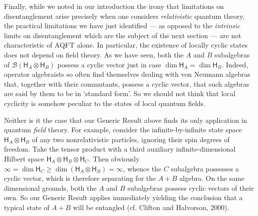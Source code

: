 \documentclass[12pt]{article}
\newcommand{\alg}[1]{\mbox{$\mathcal{#1}$}}
\newcommand{\hil}[1]{\mbox{$\mathsf{#1}$}}
\begin{document}
Finally, while we noted in our introduction the irony 
that limitations on disentanglement arise precisely when one considers 
\emph{relativistic} quantum theory, the practical limitations we have 
just identified --- as opposed to the \emph{intrinsic} limits on disentanglement which are the 
subject of the next section --- are not characteristic of AQFT alone.  
In particular, the existence of locally cyclic states does not depend on field 
theory.  As we have seen, both the $A$ and $B$ subalgebras of 
$\alg{B}(\hil{H}_{A}\otimes \hil{H}_{B})$ possess a cyclic vector 
just in case $\dim\hil{H}_{A}=\dim\hil{H}_{B}$.  Indeed, operator 
algebraists so often find themselves dealing with von Neumann algebras 
that, together with their commutants, possess a cyclic vector, that such algebras 
are said by them to be in `standard form'.  So we should not 
think that local cyclicity is somehow 
peculiar to the states of local quantum 
fields.

Neither is it the case that our Generic Result above finds its only 
application in quantum \emph{field} theory.  For example, consider the infinite-by-infinite state space 
$\hil{H}_{A}\otimes\hil{H}_{B}$ of any two nonrelativistic  
particles, ignoring their spin degrees of freedom.  Take the tensor 
product with a third auxiliary infinite-dimensional Hilbert space 
$\hil{H}_{A}\otimes\hil{H}_{B}\otimes\hil{H}_{C}$.  Then obviously 
$\infty=\dim\hil{H}_{C}\geq\dim(\hil{H}_{A}\otimes\hil{H}_{B})=\infty$, 
whence the $C$ subalgebra
possesses a cyclic vector, which is therefore 
separating for the $A+B$ algebra.  On the same dimensional grounds, both the $A$ and $B$ subalgebras 
possess cyclic vectors of their own.  So our Generic Result applies 
immediately yielding the conclusion that
a typical state of $A+B$ will be 
entangled (cf. Clifton and Halvorson, 2000).
\end{document}
